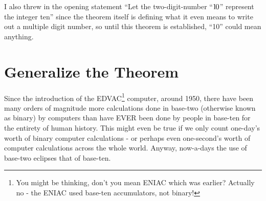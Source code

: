 \documentclass{article}
\newenvironment{jprIn}{\begin{adjustwidth}{2em}{}}{\end{adjustwidth}}
\begin{document}
I also threw in the opening statement
``Let the two-digit-number ``${1\hspace{-0.12em}0}$'' represent the integer ten''
since the theorem itself is defining what it even means to write out
a multiple digit number, so until this theorem is established, ``10'' could
mean anything.

% 
% 
% 

\section*{Generalize the Theorem}

Since the introduction of the EDVAC\footnote{You might be thinking, don't you
mean ENIAC which was earlier? Actually no - the ENIAC
used base-ten accumulators, not binary!} computer, around 1950,
there have been many orders of magnitude more calculations done
in base-two (otherwise known as binary) by computers than have EVER
been done by people in base-ten for the entirety of human history.
This might even be true if we only count one-day's worth of
binary computer calculations - or perhaps even one-second's worth
of computer calculations across the whole world.
Anyway, now-a-days the use of base-two eclipses that of base-ten.
\end{document}
